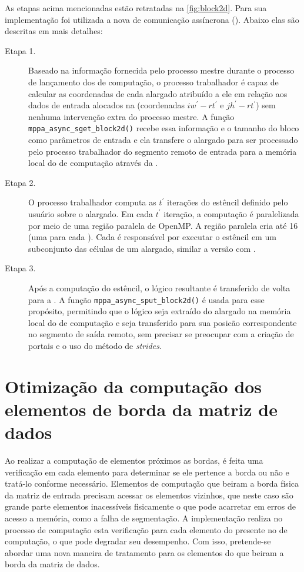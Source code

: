 As etapas acima mencionadas estão retratadas na \autoref{fig:block2d}. Para sua implementação foi utilizada a nova \api de comunicação assíncrona (\async). Abaixo elas são descritas em mais detalhes:

\begin{description}

	\item[Etapa 1.] Baseado na informação fornecida pelo processo mestre durante o processo de lançamento dos \clusters de computação, o processo trabalhador é capaz de calcular as coordenadas de cada \tile alargado atribuído a ele em relação aos dados de entrada alocados na \lpddr (coordenadas $iw^\prime - rt^\prime$ e $jh^\prime - rt^\prime$) sem nenhuma intervenção extra do processo mestre. A função \texttt{mppa\_async\_sget\_block2d()} recebe essa informação e o tamanho do bloco como parâmetros de entrada e ela transfere o \tile alargado para ser processado pelo processo trabalhador do segmento remoto de entrada para a memória local do \cluster de computação através da \noc.

	\item[Etapa 2.] O processo trabalhador computa as $t^\prime$ iterações do  estêncil definido pelo usuário sobre o \tile alargado. Em cada $t^\prime$ iteração, a computação é paralelizada por meio de uma região paralela de OpenMP. A região paralela cria até 16 \threads (uma para cada \pe). Cada \pe é responsável por executar o  estêncil em um subconjunto das células de um \tile alargado, similar a versão com \ipc.

	\item[Etapa 3.] Após a computação do  estêncil, o \tile lógico resultante é transferido de volta para a \lpddr. A função \texttt{mppa\_async\_sput\_block2d()} é usada para esse propósito, permitindo que o \tile lógico seja extraído do \tile alargado na memória local do \cluster de computação e seja transferido para sua posicão correspondente no segmento de saída remoto, sem precisar se preocupar com a criação de portais e o uso do método de \textit{strides}.

\end{description}

\section{Otimização da computação dos elementos de borda da matriz de dados}
\label{sec:otimizacao-bordas}

Ao realizar a computação de elementos próximos as bordas, é feita uma verificação em cada elemento para determinar se ele pertence a borda ou não e tratá-lo conforme necessário. Elementos de computação que beiram a borda física da matriz de entrada precisam acessar os elementos vizinhos, que neste caso são grande parte elementos inacessíveis fisicamente o que pode acarretar em erros de acesso a memória, como a falha de segmentação. A implementação \ipc realiza no processo de computação esta verificação para cada elemento do \tile presente no \cluster de computação, o que pode degradar seu desempenho. Com isso, pretende-se abordar uma nova maneira de tratamento para os elementos do \tile que beiram a borda da matriz de dados. 

